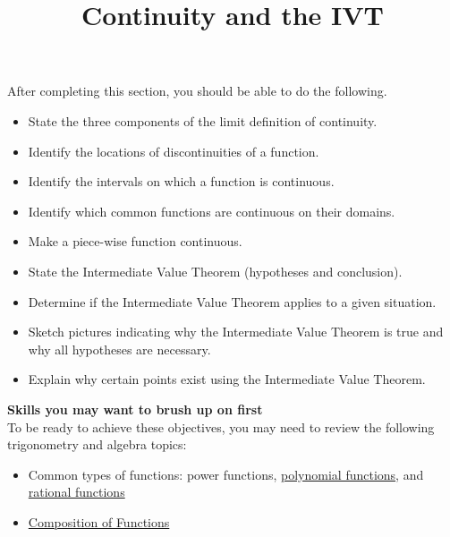 \documentclass{ximera}
\title{Continuity and the IVT}
\begin{document}
\begin{abstract}
\end{abstract}

\maketitle

\begin{sectionOutcomes}
After completing this section, you should be able to do the following.

\begin{itemize}
\item State the three components of the limit definition of continuity. 
\item Identify the locations of discontinuities of a function. 
\item Identify the intervals on which a function is continuous.
\item Identify which common functions are continuous on their domains.
\item Make a piece-wise function continuous.
\item State the Intermediate Value Theorem (hypotheses and conclusion).
\item Determine if the Intermediate Value Theorem applies to a given situation.
\item Sketch pictures indicating why the Intermediate Value Theorem is
  true and why all hypotheses are necessary.
\item Explain why certain points exist using the Intermediate Value
  Theorem.
\end{itemize}

\phantom{text}%


\textbf{Skills you may want to brush up on first} \\ To be ready to achieve these objectives, you may need to review the following trigonometry and algebra topics: 
\begin{itemize}
    \item Common types of functions: power functions, \href{https://ximera.osu.edu/math160fa17/m160prerequisites/PreRequisiteXards/U2CommonFunctions/2.1Polynomials/2.1TitlePage/2.1TitlePage}{polynomial functions}, and \href{https://ximera.osu.edu/math160fa17/m160prerequisites/PreRequisiteXards/U2CommonFunctions/2.2RationalFunctions/titlePage}{rational functions}
        \item 
  \href{https://ximera.osu.edu/math160fa17/m160prerequisites/PreRequisiteXards/U1Functions/1.3CompositionOfFunctions/titlePage}{Composition of Functions}
\end{itemize}

\end{sectionOutcomes}
\end{document}
